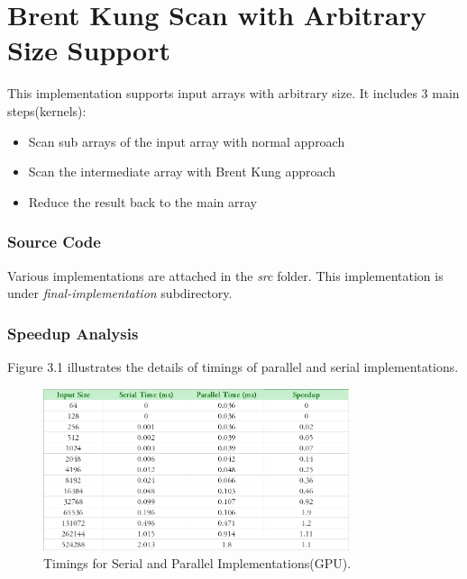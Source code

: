 \documentclass[12pt]{article}
\numberwithin{equation}{section}
\numberwithin{table}{section}
\numberwithin{figure}{section}
\begin{document}
\section{Brent Kung Scan with Arbitrary Size Support }
This implementation supports input arrays with arbitrary size. It includes 3 main steps(kernels):
\begin{itemize}
	\item Scan sub arrays of the input array with normal approach
	\item Scan the intermediate array with Brent Kung approach
	\item Reduce the result back to the main array
\end{itemize}

\subsubsection{Source Code}
Various implementations are attached in the \textit{src} folder. This implementation is under \textit{final-implementation} subdirectory.

\subsubsection{Speedup Analysis}
Figure 3.1 illustrates the details of timings of parallel and serial implementations.
\begin{figure}[!h]\centering
	\includegraphics[width=0.8\textwidth]{3_5.png}
	\caption{Timings for Serial and Parallel Implementations(GPU).}
	\label{pl1}
\end{figure}
\end{document}
